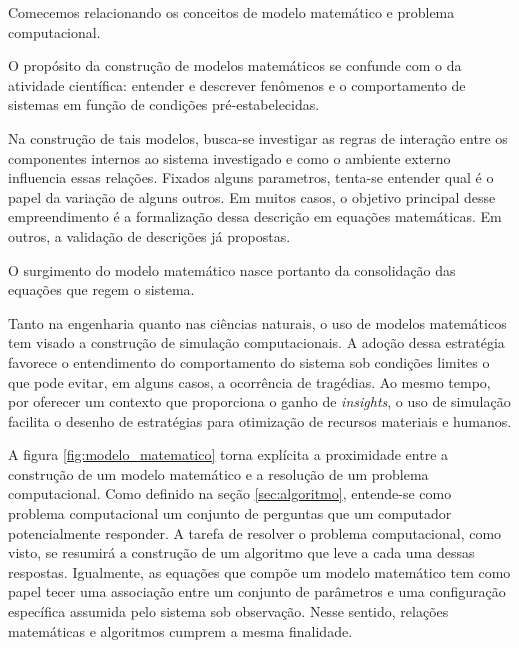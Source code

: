 Comecemos relacionando os conceitos de modelo matemático e problema computacional.

O propósito da construção de modelos matemáticos se confunde com o da atividade científica: entender e descrever fenômenos e o comportamento de sistemas em função de condições pré-estabelecidas.
 
Na construção de tais modelos, busca-se investigar as regras de interação entre os componentes internos ao sistema investigado e como o ambiente externo influencia essas relações. Fixados alguns parametros, tenta-se entender qual é o papel da variação de alguns outros. Em muitos casos, o objetivo principal desse empreendimento é a formalização dessa descrição em equações matemáticas. Em outros, a validação de descrições já propostas. 

O surgimento do modelo matemático nasce portanto da consolidação das equações que regem o sistema.

Tanto na engenharia quanto nas ciências naturais, o uso de modelos matemáticos tem visado a construção de simulação computacionais. A adoção dessa estratégia favorece o entendimento do comportamento do sistema sob condições limites o que pode evitar, em alguns casos, a ocorrência de tragédias. Ao mesmo tempo, por oferecer um contexto que proporciona o ganho de \textit{insights}, o uso de simulação facilita o desenho de estratégias para otimização de recursos materiais e humanos. 

A figura \ref{fig:modelo_matematico} torna explícita a proximidade entre a construção de um modelo matemático e a resolução de um problema computacional. Como definido na seção \ref{sec:algoritmo}, entende-se como problema computacional um conjunto de perguntas que um computador potencialmente  responder. A tarefa de resolver o problema computacional, como visto, se resumirá a construção de um algoritmo que leve a cada uma dessas respostas. Igualmente, as equações que compõe um modelo matemático tem como papel tecer uma associação entre um conjunto de parâmetros e uma configuração específica assumida pelo sistema sob observação. Nesse sentido, relações matemáticas e algoritmos cumprem a mesma finalidade.

